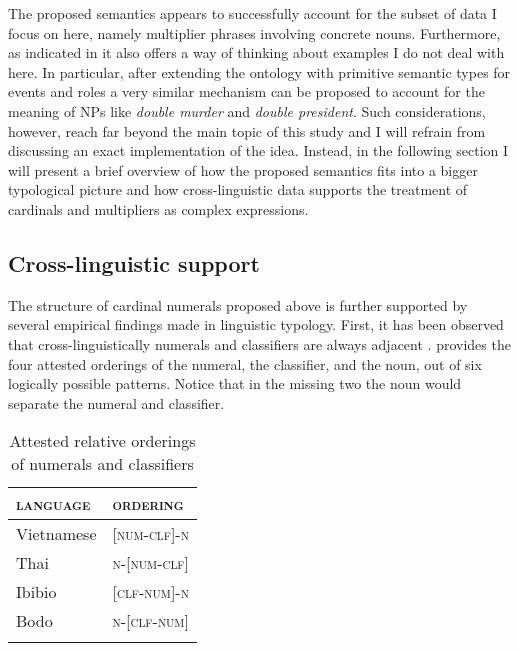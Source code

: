 	The proposed semantics appears to successfully account for the subset of data I focus on here, namely multiplier phrases involving concrete nouns. Furthermore, as indicated in   it also offers a way of thinking about examples I do not deal with here. In particular, after extending the ontology with primitive semantic types for events and roles a very similar mechanism can be proposed to account for the meaning of NPs like \textit{double murder} and \textit{double president}. Such considerations, however, reach far beyond the main topic of this study and I will refrain from discussing an exact implementation of the idea. Instead, in the following section I will present a brief overview of how the proposed semantics fits into a bigger typological picture and how cross-linguistic data supports the treatment of cardinals and multipliers as complex expressions.

	\subsection{Cross-linguistic support}\label{sec:cross-linguistic-support}
	
    	The structure of cardinal numerals proposed above is further supported by several empirical findings made in linguistic typology. First, it has been observed that cross-linguistically numerals and classifiers are always adjacent \citep{greenberg1972numeral}.   provides the four attested orderings of the numeral, the classifier, and the noun, out of six logically possible patterns. Notice that in the missing two the noun would separate the numeral and classifier.

	\begin{table}[h]
		\centering
		\begin{tabular}{ll}
			\lsptoprule
			\textsc{language} & \textsc{ordering} \\ \midrule
			Vietnamese                                          & [\textsc{num}-\textsc{clf}]-\textsc{n} \\
			Thai                                                & \textsc{n}-[\textsc{num}-\textsc{clf}] \\
			Ibibio                                              & [\textsc{clf}-\textsc{num}]-\textsc{n} \\
			Bodo                                                & \textsc{n}-[\textsc{clf}-\textsc{num}] \\ \lspbottomrule
		\end{tabular}
        \caption{Attested relative orderings of numerals and classifiers \citep{greenberg1972numeral}}
		\label{tab:orderings-numerals-classifiers}
	\end{table}

